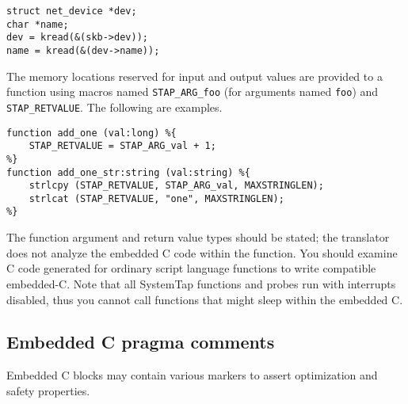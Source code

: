\documentclass[twoside,english]{article}
\newenvironment{vindent}
{\begin{list}{}{\setlength{\listparindent}{6pt}}
\item[]}
{\end{list}}
\begin{document}
\begin{vindent}
\begin{verbatim}
struct net_device *dev;
char *name;
dev = kread(&(skb->dev));
name = kread(&(dev->name));
\end{verbatim}
\end{vindent}

The memory locations reserved for input and output values are provided
to a function using macros named
\texttt{STAP\_ARG\_foo} (for arguments named
\texttt{foo}) and \texttt{STAP\_RETVALUE}. The
following are examples.

\begin{vindent}
\begin{verbatim}
function add_one (val:long) %{
    STAP_RETVALUE = STAP_ARG_val + 1;
%}
function add_one_str:string (val:string) %{
    strlcpy (STAP_RETVALUE, STAP_ARG_val, MAXSTRINGLEN);
    strlcat (STAP_RETVALUE, "one", MAXSTRINGLEN);
%}
\end{verbatim}
\end{vindent}

The function argument and return value types should be stated;
the translator does not analyze the embedded C code within the function.
You should examine
C code generated for ordinary script language functions to write compatible
embedded-C. Note that all SystemTap functions and probes run with interrupts
disabled, thus you cannot call functions that might sleep within the embedded
C.

\subsection{Embedded C pragma comments}

Embedded C blocks may contain various markers to assert optimization
and safety properties.
\end{document}
